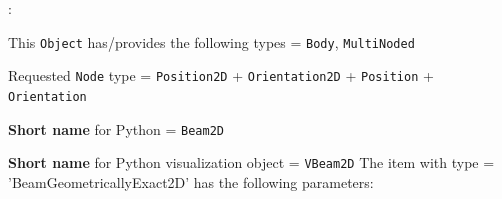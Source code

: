 \noindent {}:
\bi
  \item This \texttt{Object} has/provides the following types = \texttt{Body}, \texttt{MultiNoded}
  \item Requested \texttt{Node} type = \texttt{Position2D} + \texttt{Orientation2D} + \texttt{Position} + \texttt{Orientation}
  \item {\bf Short name} for Python = \texttt{Beam2D}
  \item {\bf Short name} for Python visualization object = \texttt{VBeam2D}
\ei\vspace{12pt} \noindent 
The item  with type = 'BeamGeometricallyExact2D' has the following parameters:
\vspace{-0.5cm}\\
\vspace{-0.5cm}\\
